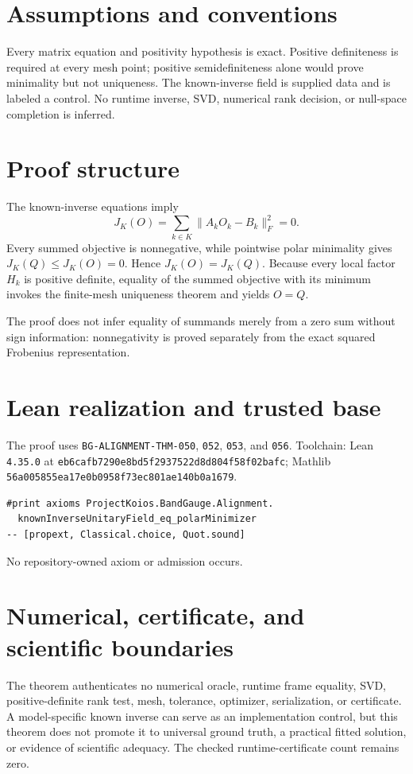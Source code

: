 \documentclass[10pt]{article}
\begin{document}
\section{Assumptions and conventions}
Every matrix equation and positivity hypothesis is exact. Positive definiteness is required at
every mesh point; positive semidefiniteness alone would prove minimality but not uniqueness. The
known-inverse field is supplied data and is labeled a control. No runtime inverse, SVD, numerical
rank decision, or null-space completion is inferred.

\section{Proof structure}
The known-inverse equations imply
\[
  J_K(O)=\sum_{k\in K}\lVert A_kO_k-B_k\rVert_F^2=0.
\]
Every summed objective is nonnegative, while pointwise polar minimality gives
$J_K(Q)\le J_K(O)=0$. Hence $J_K(O)=J_K(Q)$. Because every local factor $H_k$ is positive
definite, equality of the summed objective with its minimum invokes the finite-mesh uniqueness
theorem and yields $O=Q$.

The proof does not infer equality of summands merely from a zero sum without sign information:
nonnegativity is proved separately from the exact squared Frobenius representation.

\section{Lean realization and trusted base}
The proof uses \texttt{BG-ALIGNMENT-THM-050}, \texttt{052}, \texttt{053}, and \texttt{056}.
Toolchain: Lean \texttt{4.35.0} at
\texttt{eb6cafb7290e8bd5f2937522d8d804f58f02bafc}; Mathlib
\texttt{56a005855ea17e0b0958f73ec801ae140b0a1679}.
\begin{verbatim}
#print axioms ProjectKoios.BandGauge.Alignment.
  knownInverseUnitaryField_eq_polarMinimizer
-- [propext, Classical.choice, Quot.sound]
\end{verbatim}
No repository-owned axiom or admission occurs.

\section{Numerical, certificate, and scientific boundaries}
The theorem authenticates no numerical oracle, runtime frame equality, SVD, positive-definite rank
test, mesh, tolerance, optimizer, serialization, or certificate. A model-specific known inverse can
serve as an implementation control, but this theorem does not promote it to universal ground truth,
a practical fitted solution, or evidence of scientific adequacy. The checked runtime-certificate
count remains zero.
\end{document}
